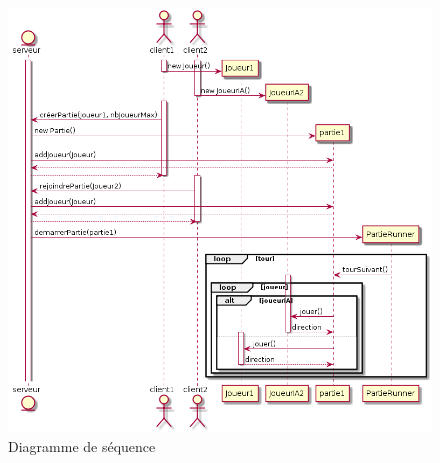 
\begin{figure}[h]%
	\includegraphics[width=\columnwidth]{images/UML_DiagSequence.png}%
	\caption{Diagramme de séquence}%
	\label{fig:useCase}%
\end{figure}